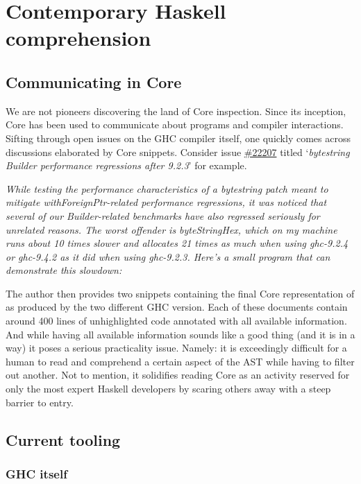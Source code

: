 \section{Contemporary Haskell comprehension}

\subsection{Communicating in Core}
\label{section:communicating_core}

We are not pioneers discovering the land of Core inspection. Since its inception, Core has
been used to communicate about programs and compiler interactions. Sifting through open issues on the
GHC compiler itself, one quickly comes across discussions elaborated by Core snippets. Consider issue
\href{https://gitlab.haskell.org/ghc/ghc/-/issues/22207}{\#22207} titled `\textit{bytestring Builder performance regressions after 9.2.3}' for example.
\hfill \break

\textit{While testing the performance characteristics of a bytestring patch meant to mitigate withForeignPtr-related performance regressions,
it was noticed that several of our Builder-related benchmarks have also regressed seriously for unrelated reasons.
The worst offender is byteStringHex, which on my machine runs about 10 times slower and allocates 21 times as much when using ghc-9.2.4 or ghc-9.4.2
as it did when using ghc-9.2.3. Here's a small program that can demonstrate this slowdown:}
\hfill \break

The author then provides two snippets containing the final Core representation of  as produced by the two different GHC version.
Each of these documents contain around 400 lines of unhighlighted code annotated with all available information. And while having all available information
sounds like a good thing (and it is in a way) it poses a serious practicality issue.
Namely: it is exceedingly difficult for a human to read and comprehend a certain aspect of the AST while having to filter out another.
Not to mention, it solidifies reading Core as an activity reserved for only the most expert Haskell developers by scaring others away with
a steep barrier to entry.

\subsection{Current tooling}

\subsubsection{GHC itself}


